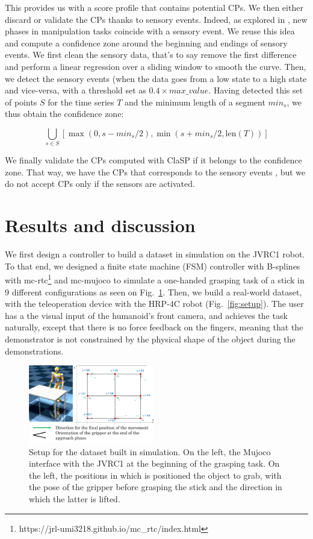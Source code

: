 \documentclass[a4paper, 10pt, conference]{ieeeconf}
\begin{document}
This provides us with a score profile that contains potential CPs. We then either discard or validate the CPs thanks to sensory events. Indeed, as explored in \cite{sensory_seg}, new phases in manipulation tasks coincide  with a sensory event. We reuse this idea and compute a confidence zone around the beginning and endings of sensory events. We first clean the sensory data, that's to say remove the first difference and perform a linear regression over a sliding window to smooth the curve. Then,  we detect the sensory events  (when the data goes from a low state to a high  state and vice-versa, with a threshold set as $0.4\times max\_value$. Having detected this set of points $S$ for the time series $T$ and the minimum length of a segment $min_s$, we thus obtain the confidence zone:

\begin{equation}
        \bigcup_{s \in S} \left[ \max(0, s - min_s/2),\min(s + min_s/2, \text{len}(T)) \right]
\end{equation}

We finally validate the CPs computed with ClaSP if it belongs to the confidence zone. That way, we have the CPs that corresponds to the sensory events , but we do not accept CPs only if the sensors are activated.

\section{Results and discussion} \label{results}

 We first design a controller to build a dataset in  simulation on the JVRC1 robot. To that end, we designed a finite state machine (FSM) controller with B-splines with mc-rtc\footnote{https://jrl-umi3218.github.io/mc\_rtc/index.html} and mc-mujoco\cite{singh2023mc} to simulate a one-handed grasping task of a stick in 9 different configurations as seen on Fig.~\ref{fig:simSetup}. Then, we build a real-world dataset, with the teleoperation device  with the HRP-4C robot (Fig.~\ref{fig:setup}). The user has a the visual input of the humanoid's front camera, and achieves the task naturally, except that there is no force  feedback on the fingers, meaning that the demonstrator is not constrained by the physical shape of the object during the demonstrations.

\begin{figure}[t]
  \centering
  \includegraphics[width=0.49\textwidth]{img/simSetup6.pdf}
  \caption{Setup for the dataset built in simulation. On the left, the Mujoco interface with the JVRC1 \cite{jvrc} at the beginning of the grasping task. On the left, the positions in which is positioned the object to grab, with the pose of the gripper before grasping the stick and the direction in which the latter is lifted.}
  \label{fig:simSetup}
\end{figure}
\end{document}
